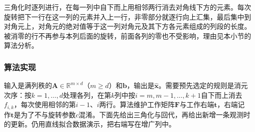 三角化时逐列进行，在每一列中自下而上用相邻两行消去对角线下方的元素。每次旋转把下一行在这一列的元素并入上一行，非零部分就逐行向上汇集，最后集中到对角元上，对角元的绝对值等于这一列对角元及其下方各元素组成的列段的长度。被消零的行不再参与本列后面的旋转，前面各列的零也不受影响，理由见本小节的算法分析。

\subsubsection{算法实现}
输入是满列秩的$\bm A\in\mathbb R^{m\times d}$（$m\geq d$）和$\bm b$，输出是$\hat{\bm x}$。需要预先选定的规则是消元次序：按$k=1,\ldots,d$处理各列，在第$k$列中按$i=m,m-1,\ldots,k+1$自下而上消去$f_{i,k}$，每次使用相邻的第$i-1$、$i$两行。算法维护工作矩阵$\bm F$与工作右端$\bm t$，右端记作$\bm t$是为了不与旋转参数$c$混淆。下面先给出三角化与回代，再给出新增一条观测时的更新。仍用直线拟合数据演示，把右端写在增广列中。

